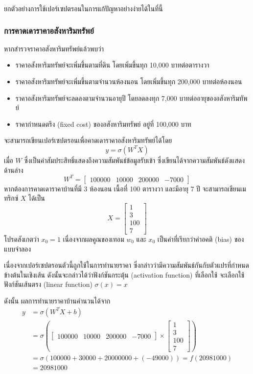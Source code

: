 \documentclass{cpereport}
\begin{document}
ยกตัวอย่างการใช้เปอร์เซปตรอนในการแก้ปัญหาอย่างง่ายได้ในที่นี้

\subsubsection{การคาดเดาราคาอสังหาริมทรัพย์}
หากสำรวจราคาอสังหาริมทรัพย์แล้วพบว่า
\begin{itemize}
    \item ราคาอสังหาริมทรัพย์จะเพิ่มขึ้นตามที่ดิน โดยเพิ่มขึ้นทุก 10,000 บาทต่อตารางวา
    \item ราคาอสังหาริมทรัพย์จะเพิ่มขึ้นตามจำนวนห้องนอน โดยเพิ่มขึ้นทุก 200,000 บาทต่อห้องนอน
    \item ราคาอสังหาริมทรัพย์จะลดลงตามจำนวนอายุปี โดยลดลงทุก 7,000 บาทต่ออายุของอสังหาริมทัพย์
    \item ราคากำหนดตรึง (fixed cost) ของอสังหาริมทรัพย์ อยู่ที่ 100,000 บาท
\end{itemize}
\noindent
จะสามารถเขียนเปอร์เซปตรอนเพื่อคาดเดาราคาอสังหาริมทรัพย์ได้โดย
$$ y = \sigma\left(W^TX\right) $$
เมื่อ $W$ ซึ่งเป็นค่าสัมประสิทธิ์แสดงถึงความสัมพันธ์ข้อมูลรับเข้า ซึ่งเขียนได้จากความสัมพันธ์ดังแสดงด้านล่าง
$$
    W^T = \begin{bmatrix}
        100000 & 10000 & 200000 & -7000
    \end{bmatrix}
$$
หากต้องการคาดเดาราคาบ้านที่มี 3 ห้องนอน เนื้อที่ 100 ตารางวา และมีอายุ 7 ปี จะสามารถเขียนเมทริกซ์ $X$ ได้เป็น
$$
    X = \begin{bmatrix}
        1 \\
        3 \\
        100 \\
        7
    \end{bmatrix}
$$
โปรดสังเกตว่า $x_0 = 1$ เนื่องจากผลคูณของเทอม $w_0$ และ $x_0$ เป็นค่าที่เรียกว่าค่าอคติ (bias) ของแบบจำลอง

เนื่องจากเปอร์เซปตรอนตัวนี้ถูกใช้ในการทำนายราคา ซึ่งกล่าวว่ามีความสัมพันธ์กันกับตัวแปรที่กำหนดข้างต้นในเชิงเส้น ดังนั้นจะกล่าวได้ว่าฟังก์ชันกระตุ้น (activation function) ที่เลือกใช้ จะเลือกใช้ฟังก์ชันเส้นตรง (linear function) $\sigma(x) = x$

ดังนั้น ผลการทำนายราคาบ้านคำนวนได้จาก
$$
    \begin{aligned}
        y &= \sigma\left(W^TX+b\right)\\
        &= \sigma\left(\begin{bmatrix}
            100000 & 10000 & 200000 & -7000
        \end{bmatrix} \times \begin{bmatrix}
            1 \\
            3 \\
            100 \\
            7
        \end{bmatrix}\right)\\
        &= \sigma(100000 + 30000 + 20000000 + (-49000)) = f(20981000)\\
        &= 20981000
    \end{aligned}
$$
\end{document}
